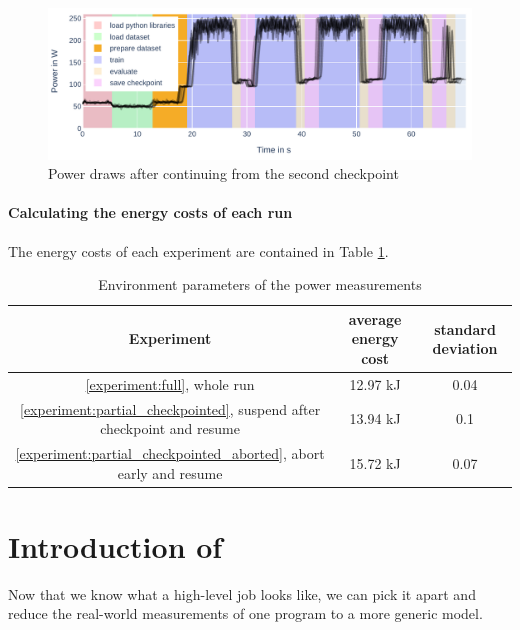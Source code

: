 \begin{figure}
    \includegraphics[width=\linewidth]{power-measurements/stacked_plots/roberta_continue_after_not_saving.pdf}
    \caption{Power draws after continuing from the second checkpoint}
    \label{fig:plot_partial_abort_continue_stacked}
\end{figure}

\paragraph{Calculating the energy costs of each run}

The energy costs of each experiment are contained in Table \ref{tab:experiment_overhead}.

\begin{table}[h!]
    \centering
    \begin{tabular}{|c|c|c|}
    \hline
        Experiment & average energy cost & standard deviation \\ \hline
        \ref{experiment:full}, whole run &  12.97 kJ & 0.04 \\ \hline
        \ref{experiment:partial_checkpointed}, suspend after checkpoint and resume &  13.94  kJ & 0.1 \\ \hline
        \ref{experiment:partial_checkpointed_aborted}, abort early and resume &  15.72 kJ & 0.07 \\ \hline
    \end{tabular}
    \caption{Environment parameters of the power measurements}
\label{tab:experiment_overhead}
\end{table}

\section{Introduction of \modelname}

Now that we know what a high-level job looks like, we can pick it apart and reduce the real-world measurements of one program to a more generic model. 

